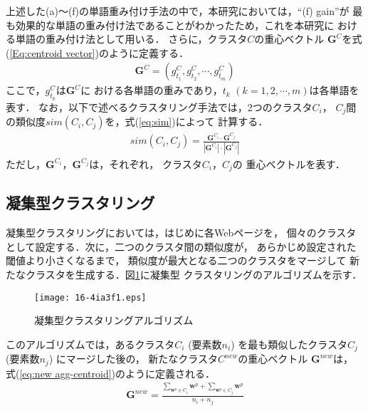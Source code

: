 \documentclass[japanese]{jnlp_1.4}
\begin{document}
上述した(a)〜(f)の単語重み付け手法の中で，本研究においては，``(f) gain''が
最も効果的な単語の重み付け法であることがわかったため，これを本研究に
おける単語の重み付け法として用いる．
さらに，クラスタ$C$の重心ベクトル
$\boldsymbol{G}^{C}$を式(\ref{Eq:centroid vector})のように定義する．
\begin{eqnarray}
 \boldsymbol{G}^{C}=(g^{C}_{t_{1}},g^{C}_{t_{2}},\cdots, g^{C}_{t_{m}})
\label{Eq:centroid vector}
\end{eqnarray}
ここで，$g^{C}_{t_{k}}$は$\boldsymbol{G}^{C}$に
おける各単語の重みであり，$t_{k}$ $(k=1,2,\cdots, m)$は各単語を表す．
なお，以下で述べるクラスタリング手法では，2つのクラスタ$C_{i}$，
$C_{j}$間の類似度$sim(C_{i},C_{j})$を，式(\ref{eq:sim})によって
計算する．
\begin{eqnarray}
 sim(C_{i},C_{j})=
\frac{\boldsymbol{G}^{C_{i}}\cdot\boldsymbol{G}^{C_{j}}}{|\boldsymbol{G}^{C_{i}}|\cdot |\boldsymbol{G}^{C_{j}}|}
\label{eq:sim}
\end{eqnarray}
ただし，$\boldsymbol{G}^{C_{i}}$，$\boldsymbol{G}^{C_{j}}$は，それぞれ，
クラスタ$C_{i}$，$C_{j}$の
重心ベクトルを表す．


\subsection{凝集型クラスタリング}
\label{subsec:AggCls}

凝集型クラスタリングにおいては，はじめに各Webページを，
\pagebreak
個々のクラスタとして設定する．次に，二つのクラスタ間の類似度が，
あらかじめ設定された閾値より小さくなるまで，
類似度が最大となる二つのクラスタをマージして
新たなクラスタを生成する．図\ref{Fig:AggClsAlgorithm}に凝集型
クラスタリングのアルゴリズムを示す．

\begin{figure}[b]
\begin{center}
\texttt{[image: 16-4ia3f1.eps]}
\end{center}
\caption{凝集型クラスタリングアルゴリズム}\label{Fig:AggClsAlgorithm}
\end{figure}

このアルゴリズムでは，あるクラスタ$C_{i}$ (要素数$n_{i}$)
を最も類似したクラスタ$C_{j}$ (要素数$n_{j}$) にマージした後の，
新たなクラスタ$C^{new}$の重心ベクトル
$\boldsymbol{G}^{new}$は，
式(\ref{eq:new agg-centroid})のように定義される．
\begin{eqnarray}
 \boldsymbol{G}^{new}=\frac{\sum_{\boldsymbol{w}^{p}\in C_{i}}\boldsymbol{w}^{p}+\sum_{\boldsymbol{w}^{p}\in C_{j}}\boldsymbol{w}^{p}}{n_{i}+n_{j}} \label{eq:new agg-centroid}
\end{eqnarray}
\end{document}
